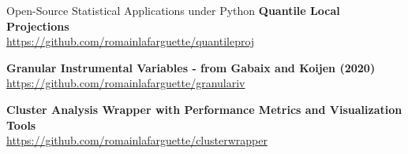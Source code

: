 \documentclass[usegeometry, 10pt, a4paper]{cv} %
\newcommand{\activite}[1]{\textbf{#1}\ }
\begin{document}
\begin{rubriquetableau}[0.95\textwidth]{Open-Source Statistical Applications under Python}
\small
\activite{Quantile Local Projections} \\
\hspace{0.6cm} \small{\url{https://github.com/romainlafarguette/quantileproj}}
\vspace{0.4cm} 

\small
\activite{Granular Instrumental Variables - from Gabaix and Koijen (2020)} \\
\hspace{0.6cm} \small{\url{https://github.com/romainlafarguette/granulariv}}
\vspace{0.4cm} 

\small
\activite{Cluster Analysis Wrapper with Performance Metrics and Visualization Tools} \\
\hspace{0.6cm} \small{\url{https://github.com/romainlafarguette/clusterwrapper}}
\vspace{0.4cm} 

\end{rubriquetableau}
\end{document}

